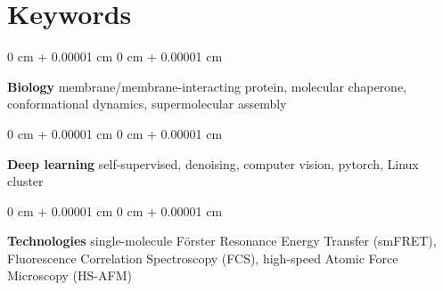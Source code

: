 \documentclass[10pt, letterpaper]{article}
\newenvironment{onecolentry}{
        \begin{adjustwidth}{
                        0 cm + 0.00001 cm
                }{
                        0 cm + 0.00001 cm
                }
        }{
        \end{adjustwidth}
} %
\begin{document}
\section{Keywords}
\begin{onecolentry}
        \textbf{Biology} membrane/membrane-interacting protein, molecular chaperone, conformational dynamics, supermolecular assembly
\end{onecolentry}

\vspace{0.2 cm}

\begin{onecolentry}
        \textbf{Deep learning} self-supervised, denoising, computer vision, pytorch, Linux cluster
\end{onecolentry}

\vspace{0.2 cm}

\begin{onecolentry}
        \textbf{Technologies} single-molecule Förster Resonance Energy Transfer (smFRET), Fluorescence Correlation Spectroscopy (FCS), high-speed Atomic Force Microscopy (HS-AFM)
\end{onecolentry}
\end{document}
